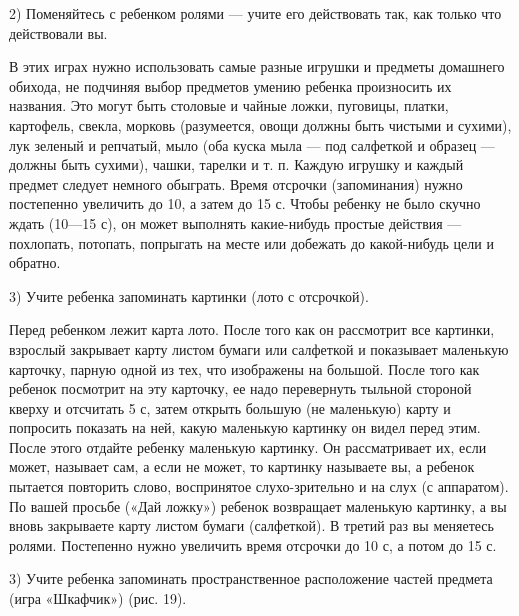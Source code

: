 \documentclass[a5paper]{book}
\begin{document}
2) Поменяйтесь с ребенком ролями --- учите его действовать так, как
только что действовали вы.

В этих играх нужно использовать самые разные игрушки и предметы
домашнего обихода, не подчиняя выбор предметов умению ребенка
произносить их названия. Это могут быть столовые и чайные ложки,
пуговицы, платки, картофель, свекла, морковь (разумеется, овощи должны
быть чистыми и сухими), лук зеленый и репчатый, мыло (оба куска мыла ---
под салфеткой и образец --- должны быть сухими), чашки, тарелки и т. п.
Каждую игрушку и каждый предмет следует немного обыграть. Время отсрочки
(запоминания) нужно постепенно увеличить до 10, а затем до 15 с. Чтобы
ребенку не было скучно ждать (10---15 с), он может выполнять
какие-нибудь простые действия --- похлопать, потопать, попрыгать на
месте или добежать до какой-нибудь цели и обратно.

3) Учите ребенка запоминать картинки (лото с отсрочкой).

Перед ребенком лежит карта лото. После того как он рассмотрит все
картинки, взрослый закрывает карту листом бумаги или салфеткой и
показывает маленькую карточку, парную одной из тех, что изображены на
большой. После того как ребенок посмотрит на эту карточку, ее надо
перевернуть тыльной стороной кверху и отсчитать 5 с, затем открыть
большую (не маленькую) карту и попросить показать на ней, какую
маленькую картинку он видел перед этим. После этого отдайте ребенку
маленькую картинку. Он рассматривает их, если может, называет сам, а
если не может, то картинку называете вы, а ребенок пытается повторить
слово, воспринятое слухо-зрительно и на слух (с аппаратом). По вашей
просьбе («Дай ложку») ребенок возвращает маленькую картинку, а вы вновь
закрываете карту листом бумаги (салфеткой). В третий раз вы меняетесь
ролями. Постепенно нужно увеличить время отсрочки до 10 с, а потом до 15
с.

3) Учите ребенка запоминать пространственное расположение частей
предмета (игра «Шкафчик») (рис. 19).
\end{document}

